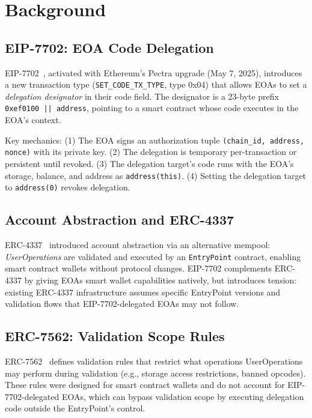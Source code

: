 \section{Background}
\label{sec:background}

\subsection{EIP-7702: EOA Code Delegation}

EIP-7702~\cite{eip7702}, activated with Ethereum's Pectra upgrade (May 7, 2025), introduces a new transaction type (\texttt{SET\_CODE\_TX\_TYPE}, type 0x04) that allows EOAs to set a \textit{delegation designator} in their code field. The designator is a 23-byte prefix \texttt{0xef0100 || address}, pointing to a smart contract whose code executes in the EOA's context.

Key mechanics: (1) The EOA signs an authorization tuple \texttt{(chain\_id, address, nonce)} with its private key. (2) The delegation is temporary per-transaction or persistent until revoked. (3) The delegation target's code runs with the EOA's storage, balance, and address as \texttt{address(this)}. (4) Setting the delegation target to \texttt{address(0)} revokes delegation.

\subsection{Account Abstraction and ERC-4337}

ERC-4337~\cite{erc4337} introduced account abstraction via an alternative mempool: \textit{UserOperations} are validated and executed by an \texttt{EntryPoint} contract, enabling smart contract wallets without protocol changes. EIP-7702 complements ERC-4337 by giving EOAs smart wallet capabilities natively, but introduces tension: existing ERC-4337 infrastructure assumes specific EntryPoint versions and validation flows that EIP-7702-delegated EOAs may not follow.

\subsection{ERC-7562: Validation Scope Rules}

ERC-7562~\cite{erc7562} defines validation rules that restrict what operations UserOperations may perform during validation (e.g., storage access restrictions, banned opcodes). These rules were designed for smart contract wallets and do not account for EIP-7702-delegated EOAs, which can bypass validation scope by executing delegation code outside the EntryPoint's control.

